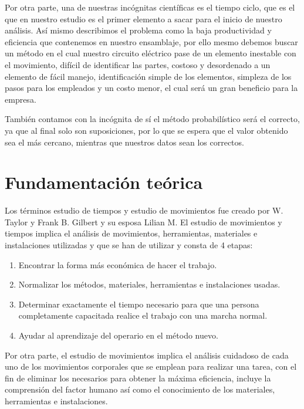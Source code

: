    Por otra parte, una de nuestras incógnitas científicas es el tiempo ciclo, que es el que en nuestro estudio es el primer elemento a sacar para el inicio de nuestro análisis. Así mismo describimos el problema como la baja productividad y eficiencia que contenemos en nuestro ensamblaje, por ello mesmo debemos buscar un método en el cual nuestro circuito eléctrico pase de un elemento inestable con el movimiento, difícil de identificar las partes, costoso y desordenado a un elemento de fácil manejo, identificación simple de los elementos, simpleza de los pasos para los empleados y un costo menor, el cual será un gran beneficio para la empresa. 
    
    También contamos con la incógnita de sí el método probabilístico será el correcto, ya que al final solo son suposiciones, por lo que se espera que el valor obtenido sea el más cercano, mientras que nuestros datos sean los correctos.
    
    \section{Fundamentación teórica}
    
    Los términos estudio de tiempos y estudio de movimientos fue creado por W. Taylor y Frank B. Gilbert y su esposa Lilian M. El estudio de movimientos y tiempos implica el análisis de movimientos, herramientas, materiales e instalaciones utilizadas y que se han de utilizar y consta de 4 etapas:
    \begin{enumerate}
        \item Encontrar la forma más económica de hacer el trabajo.
        \item Normalizar los métodos, materiales, herramientas e instalaciones usadas.
        \item Determinar exactamente el tiempo necesario para que una persona completamente capacitada realice el trabajo con una marcha normal.
    \item Ayudar al aprendizaje del operario en el método nuevo.
    \end{enumerate}
    
    Por otra parte, el estudio de movimientos implica el análisis cuidadoso de cada uno de los movimientos corporales que se emplean para realizar una tarea, con el fin de eliminar los necesarios para obtener la máxima eficiencia, incluye la comprensión del factor humano así como el conocimiento de los materiales, herramientas e instalaciones. 
    \cite{niebel1980ingenieria}
    
